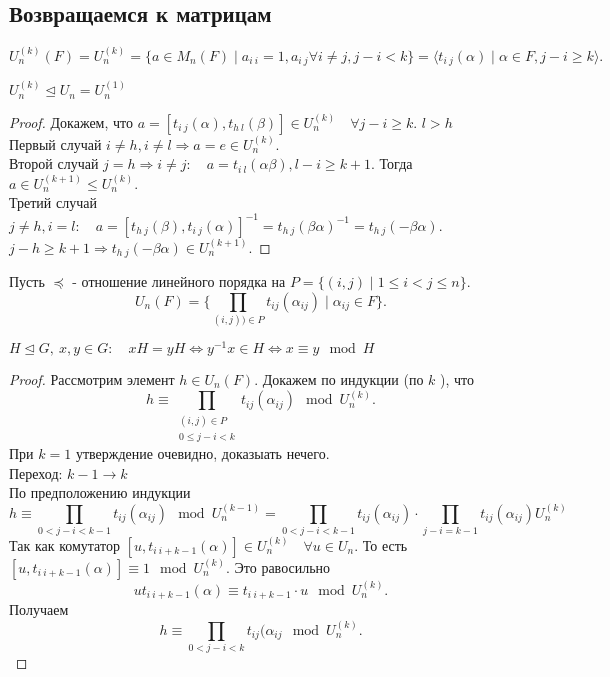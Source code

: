 \documentclass[12pt]{report}
\begin{document}
\subsection{Возвращаемся к матрицам}
\[
    U^{(k)}_n (F) = U_n ^{(k)} = \{a \in  M_n(F) \mid a_{i~i} = 1, a_{i~j} \forall i \ne j, j-i < k\} = \langle t_{i ~j}(\alpha ) \mid \alpha  \in F, j - i \ge k \rangle
.\] 
\begin{lm}
    $U_n^{(k)} \trianglelefteq U_n = U_n^{(1)}$
\end{lm}
\begin{proof}
    Докажем, что $a = [t_{i~j}(\alpha ), t_{h~l} (\beta )] \in  U_n^{(k)} \quad \forall j - i \ge  k$. $l > h$\\
    Первый случай $i \ne h, i \ne l \Rightarrow a = e \in  U_n^{(k)}$. \\
    Второй случай $j = h \Rightarrow  i \ne j: \quad a =t_{i~l}(\alpha  \beta ), l -i \ge  k+1$. Тогда $a \in U_n^{(k+1)} \le  U_n^{(k)}$.\\
    Третий случай $j \ne h, i=l: \quad a = [t_{h~j}(\beta ), t_{i~j}(\alpha )]^{-1} = t_{h~j}(\beta  \alpha )^{-1} = t_{h~j}(-\beta \alpha )$. $j -h \ge k+1 \Rightarrow  t_{h~j}(-\beta \alpha ) \in  U_n^{(k+1)}$.
\end{proof}
\begin{lm}
    Пусть  $\preccurlyeq$ - отношение линейного порядка на $P = \{(i, j) \mid 1 \le  i < j \le  n\}$.
    \[
	U_n(F) = \{\prod\limits_{(i, j)) \in  P} t_{ij} (\alpha _{ij})\mid \alpha _{ij} \in F\}
    .\] 
\end{lm}
\begin{note}
    $H \trianglelefteq G, ~x, y \in  G: \quad xH = y H \Leftrightarrow y^{-1}x \in  H \Leftrightarrow x \equiv y \mod H $
\end{note}
\begin{proof}
    Рассмотрим элемент $h \in  U_n(F)$. Докажем по индукции (по $k$ ), что 
    \[
    h \equiv \prod\limits_{
	\begin{array}{c}
	    (i, j) \in  P \\
	    0 \le  j - i < k
    \end{array}}
    t_{ij}(\alpha _{ij}) \mod U_n^{(k)}
    .\] 
    При $k = 1$ утверждение очевидно, доказыать нечего. \\
    Переход: $k-1 \to  k$ \\
    По предположению индукции $$h \equiv \prod\limits_{0< j - i < k-1}t_{ij}(\alpha _{ij}) \mod U^{(k-1)}_n =
    \prod\limits_{0<j-i< k-1}t_{ij} (\alpha _{ij}) \cdot \prod\limits_{j -i = k-1} t_{ij} (\alpha _{ij}) U_n^{(k)}$$
	Так как комутатор $[u, t_{i ~ i+k-1} (\alpha )] \in  U_n^{(k)} \quad \forall u \in  U_n$. То есть $[u, t_{i~ i+k-1} (\alpha )] \equiv 1 \mod U_n^{(k)}$. 
	Это равосильно \[
	    ut_{i~i+k-1} (\alpha ) \equiv t_{i~i+k-1} \cdot u \mod U_n^{(k)}
	.\] 
	Получаем
	\[
	    h \equiv \prod\limits_{0<j-i<k} t_{ij}(\alpha _{ij} \mod U_n^{(k)}
	.\] 

\end{proof}
\end{document}
